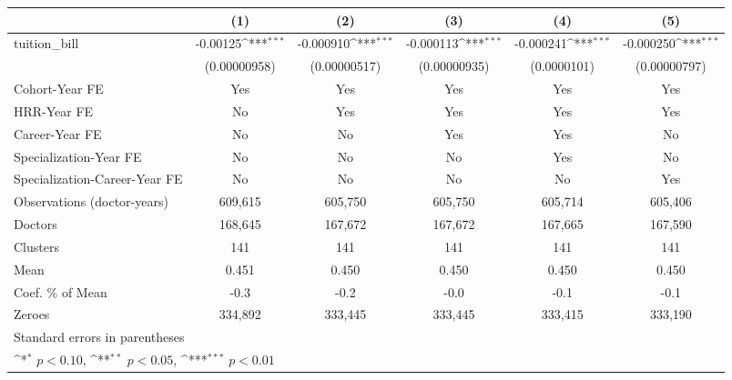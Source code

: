 {
\def\sym#1{\ifmmode^{#1}\else\(^{#1}\)\fi}
\begin{tabular}{l*{5}{c}}
\hline\hline
                    &\multicolumn{1}{c}{(1)}         &\multicolumn{1}{c}{(2)}         &\multicolumn{1}{c}{(3)}         &\multicolumn{1}{c}{(4)}         &\multicolumn{1}{c}{(5)}         \\
\hline
tuition\_bill        &    -0.00125\sym{***}&   -0.000910\sym{***}&   -0.000113\sym{***}&   -0.000241\sym{***}&   -0.000250\sym{***}\\
                    &(0.00000958)         &(0.00000517)         &(0.00000935)         & (0.0000101)         &(0.00000797)         \\
[1em]
Cohort-Year FE      &         Yes         &         Yes         &         Yes         &         Yes         &         Yes         \\
[1em]
HRR-Year FE         &          No         &         Yes         &         Yes         &         Yes         &         Yes         \\
[1em]
Career-Year FE      &          No         &          No         &         Yes         &         Yes         &          No         \\
[1em]
Specialization-Year FE&          No         &          No         &          No         &         Yes         &          No         \\
[1em]
Specialization-Career-Year FE&          No         &          No         &          No         &          No         &         Yes         \\
\hline
Observations (doctor-years)&     609,615         &     605,750         &     605,750         &     605,714         &     605,406         \\
Doctors             &     168,645         &     167,672         &     167,672         &     167,665         &     167,590         \\
Clusters            &         141         &         141         &         141         &         141         &         141         \\
Mean                &       0.451         &       0.450         &       0.450         &       0.450         &       0.450         \\
Coef. \% of Mean    &        -0.3         &        -0.2         &        -0.0         &        -0.1         &        -0.1         \\
Zeroes              &     334,892         &     333,445         &     333,445         &     333,415         &     333,190         \\
\hline\hline
\multicolumn{6}{l}{\footnotesize Standard errors in parentheses}\\
\multicolumn{6}{l}{\footnotesize \sym{*} \(p<0.10\), \sym{**} \(p<0.05\), \sym{***} \(p<0.01\)}\\
\end{tabular}
}
